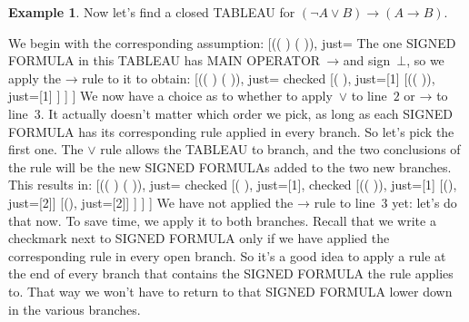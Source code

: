 \documentclass[10pt,a4paper]{article}
\newcommand*{\olup}[1]{\MakeUppercase{#1}}
\theoremstyle{plain}
\theoremstyle{definition}
\newtheorem{ex}[thm]{Example}
\theoremstyle{remark}
\newenvironment{oltableau}{}{}
\providecommand{\lif}{\mathbin{\rightarrow}}
\providecommand{\sFmla}[2]{#1(#2)}
\providecommand{\formula}{\relax}
\providecommand{\True}{\top}
\providecommand{\False}{\bot}
\providecommand{\TAss}[1]{}
\providecommand{\TRule}[1]{}
\providecommand{\formula}[1]{#1}
\begin{document}
\begin{ex}
Now let's find a closed \olup{tableau} for $(\lnot A \lor B) \lif (A
\lif B)$.

We begin with the corresponding assumption:
\begin{oltableau}
  [\sFmla{\False}{(\lnot \formula{A} \lor \formula{B}) \lif
      (\formula{A} \lif \formula{B})}, just=\TAss]
\end{oltableau}
The one \olup{signed formula} in this \olup{tableau} has \olup{main operator}~$\lif$
and sign~$\False$, so we apply the $\TRule{\False}{\lif}$ rule to it
to obtain:
\begin{oltableau}
  [\sFmla{\False}{(\lnot \formula{A} \lor \formula{B})
      \lif (\formula{A} \lif \formula{B})}, just=\TAss, checked
    [\sFmla{\True}{\lnot \formula{A} \lor \formula{B}},
      just={\TRule{\False}{\lif}[1]}
      [\sFmla{\False}{(\formula{A} \lif \formula{B})},
        just={\TRule{\False}{\lif}[1]}
      ]
    ]
  ]
\end{oltableau}
We now have a choice as to whether to apply~$\TRule{\True}{\lor}$ to
line~$2$ or $\TRule{\False}{\lif}$ to line~$3$. It actually doesn't
matter which order we pick, as long as each \olup{signed formula} has its
corresponding rule applied in every branch. So let's pick the first
one. The $\TRule{\True}{\lor}$ rule allows the \olup{tableau} to branch,
and the two conclusions of the rule will be the new \olup{signed formula}s
added to the two new branches. This results in:
\begin{oltableau}
  [\sFmla{\False}{(\lnot \formula{A} \lor \formula{B}) \lif
      (\formula{A} \lif \formula{B})}, just=\TAss, checked
    [\sFmla{\True}{\lnot \formula{A} \lor \formula{B}},
      just={\TRule{\False}{\lif}[1]}, checked
      [\sFmla{\False}{(\formula{A} \lif \formula{B})},
        just={\TRule{\False}{\lif}[1]}
        [\sFmla{\True}{\lnot \formula{A}}, just={\TRule{\True}{\lor}[2]}]
        [\sFmla{\True}{\formula{B}}, just={\TRule{\True}{\lor}[2]}]
      ]
    ]
  ]
\end{oltableau}
We have not applied the $\TRule{\False}{\lif}$ rule to line~$3$ yet:
let's do that now.  To save time, we apply it to both branches.
Recall that we write a checkmark next to \olup{signed formula} only if
we have applied the corresponding rule in every open branch. So it's a
good idea to apply a rule at the end of every branch that contains the
\olup{signed formula} the rule applies to. That way we won't have to
return to that \olup{signed formula} lower down in the various branches.
\begin{oltableau}

\end{oltableau}
\end{ex}
\end{document}
